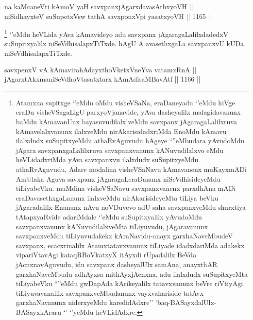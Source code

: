 
\begin{shl}
na kaMcaneVti kAmoV yaH savxpanxjAgarxdavasAthxyoVH || \\
niSidhayxteV suSupetxV\s sw tathA savxponxV\s pi yasatxyoVH ||  1165 ||  
\end{shl}

\begin{artha}
\footnote{Atamxna supitxge `\stext'eMdu oMdu visheVSaNa, eraDaneyadu `\stext'eMdu hiVge eraDu visheVSagaLigU parxyoVjanavide, yAva dasheyalilx malagidavanunx baMdu kAmavanUnx bayasuvudilalx'veMdu savxpanx jAgaragaLalilxruva kAmavelalxvanunx ilalxveMdu nirAkarisidadxriMda EnoMdu kAmavu ilalxdudx suSupitxyeMdu athaRvAguvudu hAgeye ``\stext''eMbudara yAvudoMdu jAgara savxpanxgaLalilxruva savxpanxvanunx kANuvudilalxvo eMdu heVLidadxriMda yAva savxpanxvu ilalxdudx suSupitxyeMdu athaRvAguvudu, Adare modalina visheVSaNavu kAmavanenx muKayxmADi AmUlaka Aguva savxpanx jAgaragaLeraDanunx niSeVdhisideyeMdu tiLiyabeVku. muMdina visheVSaNavu savxpanxvanenx parxdhAna mADi eraDavasethxgaLanunx ilalxveMdu nirAkarisideyeMta tiLiya beVku  jAgaradalilx Enanunx nAvu noVDuvevo adU saha savxpanxveMdu shurxtiya tAtapxyaRvide adariMdale `\stext'eMdu suSupitxyalilx yAvudoMdu savxpanxvanunx kANuvudilalxveMta tiLiyuvudu, jAgaravanunx savxpanxveMdu tiLiyuvudakekx kAraNavidu-anayx garxhaNaveMbudeV savxpanx, ecacxrinalilx Atamxtatavxvanunx tiLiyade idadxdariMda adakekx vipariVtavAgi kataqRBoVkatxyX itAyxdi rUpadalilx BeVda jAcnxnavAguvudu, idu savxpanx dasheyalUlx samAna, anayxthAR garxhaNaveMbudu adhAyxsa mithAyxjAcnxna. adu ilalxdudx suSupitxyeMta tiLiyabeVku ``\stext''eMdu gwDapAda kArikeyalilx tatavxvanunx beVre riVtiyAgi tiLiyuvavanalilx savxpanxveMbudanunx vayxvahariside tatAvx garxhaNavanunx niderxyeMdu karedidAdxre'' `baq-BASayxdalUlx-BASayxkAraru `\stext' `\stext'yeMdu heVLidAdxre.}
`\stext'eMdu heVLida yAva kAmavideyo adu savxpanx jAgaragaLalilxdadedxV suSupitxyalilx niSeVdhisalapxTiTxde. hAgU A avasethxgaLa savxpanxvU kUDa niSeVdhisalapxTiTxde.
\end{artha}


\begin{shl}
savxpenxV vA kAmavirahAdayxthoVketxVneYva vatamxRnA || \\
jAgarxtAkxmaniSeVdhoV\s tasatxtarx kAmAdisaMBavAtf ||  1166 ||  
\end{shl}

